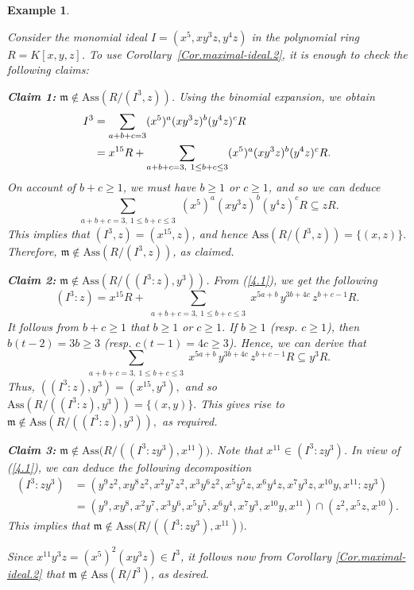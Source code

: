 \documentclass[11pt]{amsart}
\newtheorem{example}[theorem]{Example}
\begin{document}
\begin{example}\label{App.2}
\em{
Consider the monomial ideal  $I=(x^5, xy^3z, y^4z)$  in the polynomial ring $R=K[x,y,z]$.
 To use Corollary~\ref{Cor.maximal-ideal.2}, it is enough to check the following claims:
 
 \bigskip
\textbf{Claim 1:} $\mathfrak{m}\notin \mathrm{Ass}(R/(I^3, z))$. Using the binomial expansion, we obtain
\begin{align}
I^3
&= \sum_{a+b+c=3} (x^5)^a (x y^{3} z)^b (y^{4} z)^cR \label{4.1} \\
&= x^{15}R + \sum_{\substack{a+b+c=3,~ 1\leq b+c\leq 3}}
(x^5)^a (x y^{3} z)^b (y^{4} z)^cR.
\notag
\end{align}
On account of $b+c\geq 1$, we must have $b\geq 1$ or $c\geq 1$, and so we can deduce 
\[
\sum_{\substack{a+b+c=3,~ 1\leq b+c\leq 3}}
(x^5)^a (x y^{3} z)^b (y^{4} z)^cR \subseteq zR.
\]
This implies  that $(I^3, z)=(x^{15}, z)$, and hence $\mathrm{Ass}(R/(I^3, z)) = \{(x,z)\}.$ 
Therefore, $\mathfrak{m}\notin \mathrm{Ass}(R/(I^3, z))$, as claimed.


\bigskip
\textbf{Claim 2:} $\mathfrak{m}\notin \mathrm{Ass}(R/((I^3 : z), y^{3}))$.
 From (\ref{4.1}), we get the following 
\[
(I^3 : z)
= x^{15}R
+ \sum_{\substack{a+b+c=3,~ 1\leq b+c\leq 3}}
x^{5a+b}\, y^{3b+4c}\, z^{b+c-1}R.
\]
It follows from  $b+c\geq 1$ that  $b\geq 1$ or $c\geq 1$. If $b\geq 1$ (resp. $c\geq 1$), then
$b(t-2)=3b\geq 3$ (resp. $c(t-1)=4c\geq 3$). Hence, we can derive that
\[
\sum_{\substack{a+b+c=3,~ 1\leq b+c\leq 3}}
x^{5a+b}\, y^{3b+4c}\, z^{b+c-1}R
\subseteq y^{3}R.
\]
Thus, $((I^3 : z), y^{3}) = (x^{15}, y^{3}),$ and so $\mathrm{Ass}(R/((I^3 : z), y^{3})) = \{(x,y)\}.$ 
This gives rise to $\mathfrak{m}\notin \mathrm{Ass}(R/((I^3 : z), y^{3})),$ as required.
 
\bigskip
\textbf{Claim 3:}  $\mathfrak{m}\notin \mathrm{Ass}\big(R/((I^3 : zy^{3}), x^{11})\big).$ Note that $x^{11}\in (I^3 : zy^{3})$. 
 In view of  (\ref{4.1}), we can deduce  the following decomposition
 \begin{align*}
(I^3 : zy^{3}) &=(y^9 z^2,x y^8 z^2,x^2 y^7 z^2,x^3 y^6 z^2, x^5 y^5 z,x^6 y^4 z, x^7 y^3 z,x^{10} y,x^{11}:zy^3)\\
&=(y^{9}, xy^{8}, x^{2}y^{7}, x^{3}y^{6}, x^{5}y^{5}, x^{6}y^{4}, x^{7}y^{3}, x^{10}y, x^{11}) \cap
 (z^{2}, x^{5}z, x^{10}).
 \end{align*}
This implies that  $\mathfrak{m}\notin \mathrm{Ass}\big(R/((I^3 : zy^{3}), x^{11})\big).$
 
Since $x^{11}y^3z=(x^5)^2(xy^3z)\in I^3$, it follows now from Corollary \ref{Cor.maximal-ideal.2} that $\mathfrak{m} \notin \mathrm{Ass}(R/I^3)$, as desired. 
}
\end{example}
\end{document}
